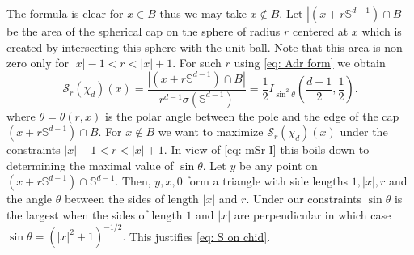 \documentclass[a4paper, reqno]{amsart}
\theoremstyle{definition}
\newcommand{\mS}{\mathcal{S}}
\begin{document}
The formula is clear for $x\in B$ thus we may take $x\not \in B.$ Let $|(x+r{\mathbb{S}}^{d-1})\cap B|$ be the area of the spherical cap on the sphere of radius $r$ centered at $x$ which is created by intersecting this sphere with the unit ball. Note that this area is non-zero only for $|x|-1<r<|x|+1$. For such $r$ using \eqref{eq: Adr form} we obtain
\begin{equation}
\label{eq: mSr I}
\mS_r (\chi_d)(x)=\frac{|(x+r{\mathbb{S}}^{d-1})\cap B|}{r^{d-1}\sigma(\mathbb{S}^{d-1})}=\frac{1}{2} I_{\sin^2 \theta}\left(\frac{d-1}{2},\frac{1}{2}\right).
\end{equation}
where $\theta=\theta(r,x)$ is   the polar angle between the pole and the edge of the cap $(x+r{\mathbb{S}}^{d-1})\cap B.$ For $x\not \in B$ we want to maximize $\mS_r (\chi_d)(x)$ under the constraints $|x|-1<r<|x|+1.$ In view of \eqref{eq: mSr I} this boils down to determining the maximal value of $\sin\theta.$  Let $y$ be any point on $(x+r{\mathbb{S}}^{d-1})\cap \mathbb{S}^{d-1}.$ Then, $y,x,0$ form a triangle with side lengths $1,|x|,r$ and the angle $\theta$ between the sides of length $|x|$ and $r.$ Under our constraints $\sin \theta$ is the largest when the sides of length $1$ and $|x|$ are perpendicular in which case $\sin \theta=(|x|^2+1)^{-1/2}.$ This justifies \eqref{eq: S on chid}.
\end{document}
